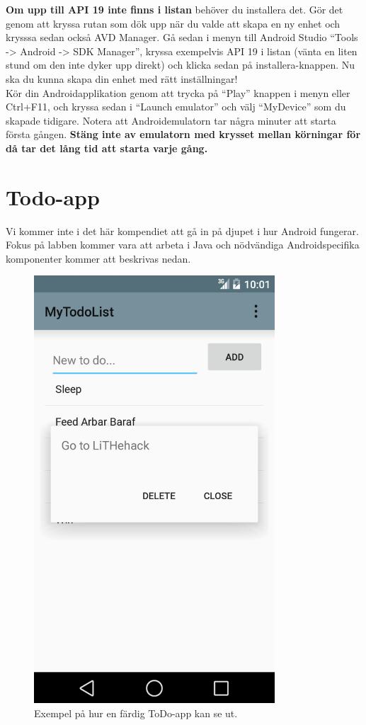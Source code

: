 \documentclass[11 pt, titlepage]{article} %
\begin{document}
\textbf{Om upp till API 19 inte finns i listan} behöver du installera det.
Gör det genom att kryssa rutan som dök upp när du valde att skapa en ny enhet och krysssa sedan också AVD Manager.
Gå sedan i menyn till Android Studio “Tools -> Android -> SDK Manager”, kryssa exempelvis API 19 i listan (vänta en liten stund om den inte dyker upp direkt) och klicka sedan på installera-knappen.
Nu ska du kunna skapa din enhet med rätt inställningar!\\

Kör din Androidapplikation genom att trycka på “Play” knappen i menyn eller Ctrl+F11, och kryssa sedan i ``Launch emulator'' och välj ``MyDevice'' som du skapade tidigare.
Notera att Androidemulatorn tar några minuter att starta första gången.
\textbf{Stäng inte av emulatorn med krysset mellan körningar för då tar det lång tid att starta varje gång.}

\section{Todo-app}
Vi kommer inte i det här kompendiet att gå in på djupet i hur Android fungerar.
Fokus på labben kommer vara att arbeta i Java och nödvändiga Androidspecifika komponenter kommer att beskrivas nedan.
\begin{figure}[ht!]
\centering
\includegraphics[width=90mm]{images/app.png}
\caption{Exempel på hur en färdig ToDo-app kan se ut.}
\label{overflow}
\end{figure}
\end{document}
